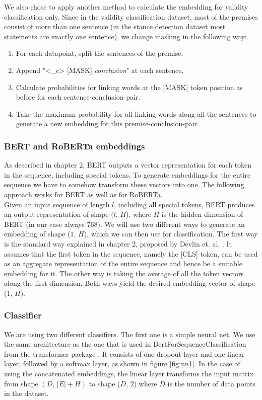 We also chose to apply another method to calculate the embedding for validity classification only. Since in the validity classification dataset, most of the premises consist of more than one sentence (in the stance detection dataset most statements are exactly one sentence), we change masking in the following way: \\
\begin{enumerate}
	\item For each datapoint, split the sentences of the premise.
	\item Append "<\_c> [MASK] \textit{conclusion}" at each sentence.
	\item Calculate probabilities for linking words at the [MASK] token position as before for each sentence-conclusion-pair.
	\item Take the maximum probability for all linking words along all the sentences to generate a new embedding for this premise-conclusion-pair.
\end{enumerate}

\subsubsection{BERT and RoBERTa embeddings} \label{sec:bertembeddings}
As described in chapter 2, BERT outputs a vector representation for each token in the sequence, including special tokens. To generate embeddings for the entire sequence we have to somehow transform these vectors into one. The following approach works for BERT as well as for RoBERTa.\\
Given an input sequence of length $l$, including all special tokens, BERT produces an output representation of shape ($l$, $H$), where $H$ is the hidden dimension of BERT (in our case always $768$). We will use two different ways to generate an embedding of shape ($1$, $H$), which we can then use for classification. The first way is the standard way explained in chapter 2, proposed by Devlin et. al. \cite{bert}. It assumes that the first token in the sequence, namely the [CLS] token, can be used as an aggregate representation of the entire sequence and hence be a suitable embedding for it. The other way is taking the average of all the token vectors along the first dimension. Both ways yield the desired embedding vector of shape ($1$, $H$).

\subsubsection{Classifier}
We are using two different classifiers. The first one is a simple neural net. We use the same architecture as the one that is used in BertForSequenceClassification from the transformer package \cite{bertimpl}. It consists of one dropout layer and one linear layer, followed by a softmax layer, as shown in figure \ref{fig:nn1}. In the case of using the concatenated embeddings, the linear layer transforms the input matrix from shape $(D, \, |E| + H)$ to shape ($D$, $2$) where $D$ is the number of data points in the dataset. 

